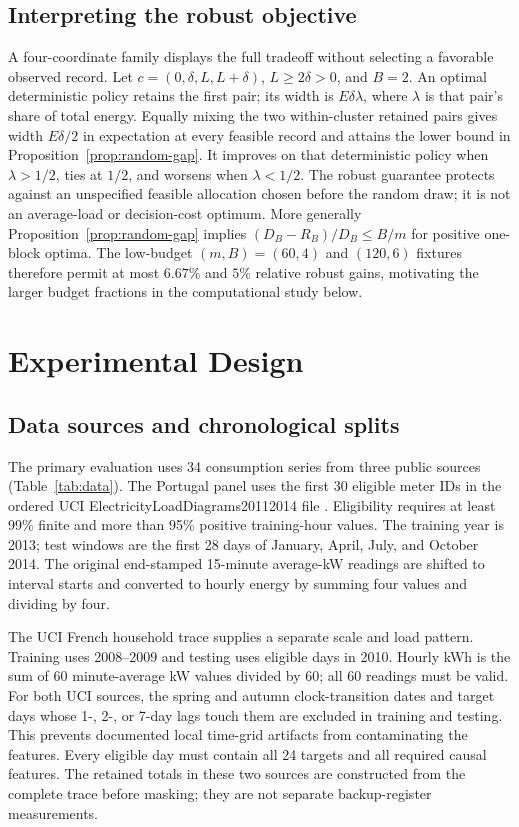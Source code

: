\documentclass[12pt]{article}
\begin{document}
\subsection{Interpreting the robust objective}
A four-coordinate family displays the full tradeoff without selecting a
favorable observed record. Let $c=(0,\delta,L,L+\delta)$, $L\geq2\delta>0$,
and $B=2$. An optimal deterministic policy retains the first pair; its width
is $E\delta\lambda$, where $\lambda$ is that pair's share of total energy.
Equally mixing the two within-cluster retained pairs gives width
$E\delta/2$ in expectation at every feasible record and attains the lower
bound in Proposition~\ref{prop:random-gap}. It improves on that deterministic
policy when $\lambda>1/2$, ties at $1/2$, and worsens when $\lambda<1/2$.
The robust guarantee protects against an unspecified feasible allocation
chosen before the random draw; it is not an average-load or decision-cost
optimum. More generally Proposition~\ref{prop:random-gap} implies
$(D_B-R_B)/D_B\leq B/m$ for positive one-block optima. The low-budget
$(m,B)=(60,4)$ and $(120,6)$ fixtures therefore permit at most $6.67\%$
and $5\%$ relative robust gains, motivating the larger budget fractions in
the computational study below.

\section{Experimental Design}
\subsection{Data sources and chronological splits}
The primary evaluation uses 34 consumption series from three public sources
(Table~\ref{tab:data}). The Portugal panel uses the first 30 eligible meter
IDs in the ordered UCI ElectricityLoadDiagrams20112014 file \cite{portugal}.
Eligibility requires at least 99\% finite and more than 95\% positive
training-hour values. The training year is 2013; test windows are the first
28 days of January, April, July, and October 2014. The original end-stamped
15-minute average-kW readings are shifted to interval starts and converted
to hourly energy by summing four values and dividing by four.

The UCI French household trace \cite{uci} supplies a separate scale and
load pattern. Training uses 2008--2009 and testing uses eligible days in
2010. Hourly kWh is the sum of 60 minute-average kW values divided by 60;
all 60 readings must be valid. For both UCI sources, the spring and autumn
clock-transition dates and target days whose 1-, 2-, or 7-day lags touch
them are excluded in training and testing. This prevents documented local
time-grid artifacts from contaminating the features. Every eligible day
must contain all 24 targets and all required causal features. The retained
totals in these two sources are constructed from the complete trace before
masking; they are not separate backup-register measurements.
\end{document}
